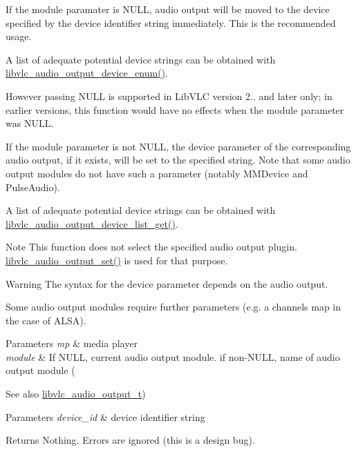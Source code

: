 If the module paramater is N\+U\+LL, audio output will be moved to the device specified by the device identifier string immediately. This is the recommended usage.

A list of adequate potential device strings can be obtained with \hyperlink{group__libvlc__audio_ga5d13bb70351f6fa597d8f1b553da81d5}{libvlc\+\_\+audio\+\_\+output\+\_\+device\+\_\+enum()}.

However passing N\+U\+LL is supported in Lib\+V\+LC version 2.. and later only; in earlier versions, this function would have no effects when the module parameter was N\+U\+LL.

If the module parameter is not N\+U\+LL, the device parameter of the corresponding audio output, if it exists, will be set to the specified string. Note that some audio output modules do not have such a parameter (notably M\+M\+Device and Pulse\+Audio).

A list of adequate potential device strings can be obtained with \hyperlink{group__libvlc__audio_ga4f94073a71cd9ee6641ce9bbbfdaf5f3}{libvlc\+\_\+audio\+\_\+output\+\_\+device\+\_\+list\+\_\+get()}.

\begin{DoxyNote}{Note}
This function does not select the specified audio output plugin. \hyperlink{group__libvlc__audio_ga1e0e783b4b68a4544cc688d8f8c38284}{libvlc\+\_\+audio\+\_\+output\+\_\+set()} is used for that purpose.
\end{DoxyNote}
\begin{DoxyWarning}{Warning}
The syntax for the device parameter depends on the audio output.
\end{DoxyWarning}
Some audio output modules require further parameters (e.\+g. a channels map in the case of A\+L\+SA).


\begin{DoxyParams}{Parameters}
{\em mp} & media player \\
\hline
{\em module} & If N\+U\+LL, current audio output module. if non-\/\+N\+U\+LL, name of audio output module (\\
\hline
\end{DoxyParams}
\begin{DoxySeeAlso}{See also}
\hyperlink{structlibvlc__audio__output__t}{libvlc\+\_\+audio\+\_\+output\+\_\+t}) 
\end{DoxySeeAlso}

\begin{DoxyParams}{Parameters}
{\em device\+\_\+id} & device identifier string \\
\hline
\end{DoxyParams}
\begin{DoxyReturn}{Returns}
Nothing. Errors are ignored (this is a design bug). 
\end{DoxyReturn}
\mbox{\label{group__libvlc__audio_ga8c4c8a6c886a9ed33c7de477f363f76f}} 
